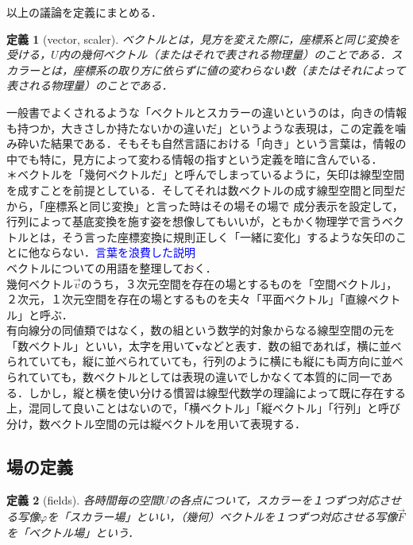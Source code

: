 \documentclass[uplatex, 12pt, a4paper]{jsarticle}
\newtheorem{definition}{定義}
\begin{document}
以上の議論を定義にまとめる．\\
\begin{shadebox}
\begin{definition}[vector, scaler] \label{vector, scaler}
    ベクトルとは，見方を変えた際に，座標系と同じ変換を受ける，$U$内の幾何ベクトル（またはそれで表される物理量）のことである．スカラーとは，座標系の取り方に依らずに値の変わらない数（またはそれによって表される物理量）のことである．
\end{definition}\end{shadebox}
一般書でよくされるような「ベクトルとスカラーの違いというのは，向きの情報も持つか，大きさしか持たないかの違いだ」というような表現は，この定義を噛み砕いた結果である．そもそも自然言語における「向き」という言葉は，情報の中でも特に，見方によって変わる情報の指すという定義を暗に含んでいる．\\

\noindent
＊ベクトルを「幾何ベクトルだ」と呼んでしまっているように，矢印は線型空間を成すことを前提としている．そしてそれは数ベクトルの成す線型空間と同型だから，「座標系と同じ変換」と言った時はその場その場で
成分表示を設定して，行列によって基底変換を施す姿を想像してもいいが，ともかく物理学で言うベクトルとは，そう言った座標変換に規則正しく「一緒に変化」するような矢印のことに他ならない．\textcolor{blue}{言葉を浪費した説明}\\

ベクトルについての用語を整理しておく．\\
幾何ベクトル$\vec{v}$のうち，３次元空間を存在の場とするものを「空間ベクトル」，２次元，１次元空間を存在の場とするものを夫々「平面ベクトル」「直線ベクトル」と呼ぶ．\\
有向線分の同値類ではなく，数の組という数学的対象からなる線型空間の元を「数ベクトル」といい，太字を用いて$\mathbf{v}$などと表す．数の組であれば，横に並べられていても，縦に並べられていても，行列のように横にも縦にも両方向に並べられていても，数ベクトルとしては表現の違いでしかなくて本質的に同一である．しかし，縦と横を使い分ける慣習は線型代数学の理論によって既に存在する上，混同して良いことはないので，「横ベクトル」「縦ベクトル」「行列」と呼び分け，数ベクトル空間の元は縦ベクトルを用いて表現する．

\subsection{場の定義}

\begin{shadebox} \begin{definition}[fields]
    各時間毎の空間$U$の各点について，スカラーを１つずつ対応させる写像$\varphi$を「スカラー場」といい，（幾何）ベクトルを１つずつ対応させる写像$\overrightarrow{F}$を「ベクトル場」という．
\end{definition} \end{shadebox} 
\end{document}
